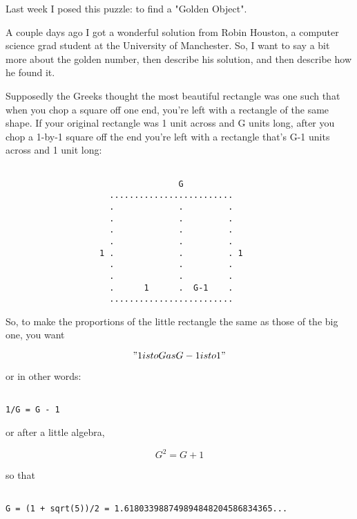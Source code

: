 


Last week I posed this puzzle: to find a "Golden Object".

A couple days ago I got a wonderful solution from Robin Houston, a computer 
science grad student at the University of Manchester.  So, I want to say a 
bit more about the golden number, then describe his solution, and then 
describe how he found it.

Supposedly the Greeks thought the most beautiful rectangle was one such 
that when you chop a square off one end, you're left with a rectangle 
of the same shape.  If your original rectangle was 1 unit across and G 
units long, after you chop a 1-by-1 square off the end you're left with 
a rectangle that's G-1 units across and 1 unit long:
                           

\begin{verbatim}

                                   G
                     .........................
                     .             .         .
                     .             .         .
                     .             .         .
                     .             .         .
                   1 .             .         . 1
                     .             .         .
                     .             .         .
                     .      1      .  G-1    .
                     .........................
\end{verbatim}
    
So, to make the proportions of the little rectangle the same as those of
the big one, you want


$$

"1 is to G as G-1 is to 1"
$$
    
or in other words:


\begin{verbatim}

1/G = G - 1 
\end{verbatim}
    
or after a little algebra,


$$

G^{2} = G + 1
$$
    
so that


\begin{verbatim}

G = (1 + sqrt(5))/2 = 1.618033988749894848204586834365...
\end{verbatim}
    
